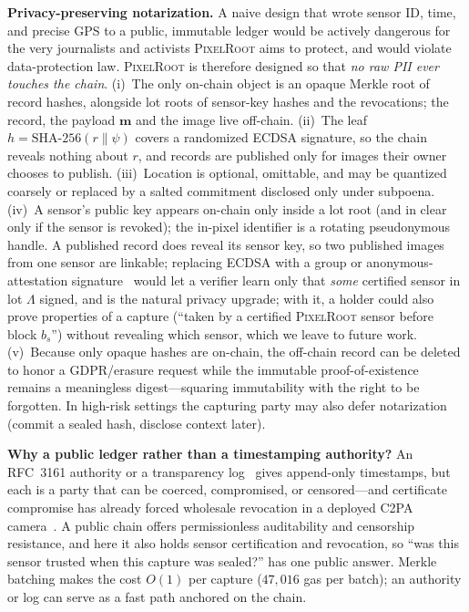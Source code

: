 \documentclass[journal]{IEEEtran}
\newcommand{\pr}{\textup{\textsc{PixelRoot}}}
\begin{document}
\else
\textbf{Privacy-preserving notarization.} A naive design that wrote sensor
$\mathrm{ID}$, time, and precise GPS to a public, immutable ledger would be
actively dangerous for the very journalists and activists \pr{} aims to protect,
and would violate data-protection law. \pr{} is therefore designed so that
\emph{no raw PII ever touches the chain}. (i)~The only on-chain object is an
opaque Merkle root of record hashes, alongside lot roots of sensor-key hashes
and the revocations; the record, the payload $\mathbf{m}$ and the image live
off-chain. (ii)~The leaf $h=\mathrm{SHA\text{-}256}(r\|\psi)$ covers a
randomized ECDSA signature, so the chain reveals nothing about $r$, and records
are published only for images their owner chooses to publish. (iii)~Location is optional, omittable, and may be quantized coarsely or
replaced by a salted commitment disclosed only under subpoena. (iv)~A sensor's
public key appears on-chain only inside a lot root (and in clear only if the
sensor is revoked); the in-pixel identifier is a rotating pseudonymous handle.
A published record does reveal its sensor key, so two published images from one
sensor are linkable; replacing ECDSA with a group or anonymous-attestation
signature~\cite{brickell2004daa} would let a verifier learn only that
\emph{some} certified sensor in lot $\Lambda$ signed, and is the natural
privacy upgrade; with it, a holder could also prove properties of a capture
(``taken by a certified \pr{} sensor before block $b_s$'') without revealing which
sensor, which we leave to future work. (v)~Because only opaque hashes are
on-chain, the off-chain record can be deleted to honor a GDPR/erasure request
while the immutable proof-of-existence remains a meaningless digest---squaring
immutability with the right to be forgotten. In high-risk settings the capturing
party may also defer notarization (commit a sealed hash, disclose context later).

\fi
\ifshort
\textbf{Why a public ledger rather than a timestamping authority?} An RFC~3161
authority or a transparency log~\cite{rfc6962} gives append-only timestamps, but
each is a party that can be coerced, compromised, or censored---and certificate
compromise has already forced wholesale revocation in a deployed C2PA
camera~\cite{c2pa2026security}. A public chain offers permissionless auditability
and censorship resistance, and here it also holds sensor certification and
revocation, so ``was this sensor trusted when this capture was sealed?'' has one
public answer. Merkle batching makes the cost $O(1)$ per capture
($47{,}016$ gas per batch); an authority or log can serve as a fast path anchored
on the chain.
\end{document}
